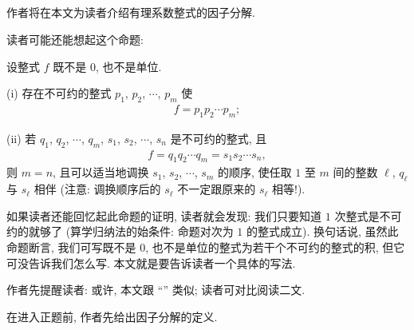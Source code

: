 \subsection*{\FactorizationOfPolynomialsOverQ}
\markright{\FactorizationOfPolynomialsOverQ}

作者将在本文为读者介绍有理系数整式的因子分解.

读者可能还能想起这个命题:
\begin{proposition}
    设整式 $f$ 既不是 $0$, 也不是单位.

    (i) 存在不可约的整式 $p_1$, $p_2$, $\cdots$, $p_m$ 使
    \begin{align*}
        f = p_1 p_2 \cdots p_m;
    \end{align*}

    (ii) 若 $q_1$, $q_2$, $\cdots$, $q_m$, $s_1$, $s_2$, $\cdots$, $s_n$ 是不可约的整式, 且
    \begin{align*}
        f = q_1 q_2 \cdots q_m = s_1 s_2 \cdots s_n,
    \end{align*}
    则 $m = n$, 且可以适当地调换 $s_1$, $s_2$, $\cdots$, $s_m$ 的顺序, 使任取 $1$ 至 $m$ 间的整数 $\ell$, $q_\ell$ 与 $s_\ell$ 相伴 (注意: 调换顺序后的 $s_\ell$ 不一定跟原来的 $s_\ell$ 相等!).
\end{proposition}

如果读者还能回忆起此命题的证明, 读者就会发现: 我们只要知道 $1$ 次整式是不可约的就够了 (算学归纳法的始条件: 命题对次为 $1$ 的整式成立). 换句话说, 虽然此命题断言, 我们可写既不是 $0$, 也不是单位的整式为若干个不可约的整式的积, 但它可没告诉我们怎么写. 本文就是要告诉读者一个具体的写法.

作者先提醒读者: 或许, 本文跟 ``\FactorizationOfIntegers'' 类似; 读者可对比阅读二文.

在进入正题前, 作者先给出因子分解的定义.

